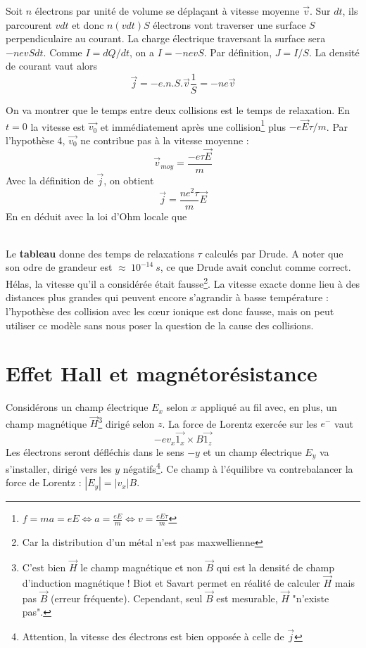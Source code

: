 Soit $n$ électrons par unité de volume se déplaçant à vitesse moyenne $\vec{v}$. Sur 
$dt$, ils parcourent $vdt$ et donc $n(vdt)S$ électrons vont traverser une surface $S$ 
perpendiculaire au courant. La charge électrique traversant la surface sera $-nevSdt$.
Comme $I = dQ/dt$, on a $I = -nevS$. Par définition, $J = I/S$. La densité de courant 
vaut alors
\begin{equation}
\vec j = -e.n.S.\vec v\frac{1}{S} = -ne\vec{v}
\end{equation}

On va montrer que le temps entre deux collisions est le temps de relaxation. En $t=0$ 
la vitesse est $\vec{v_0}$ et immédiatement après une collision\footnote{$f = ma = eE 
\Leftrightarrow a = \frac{eE}{m} \Leftrightarrow v = \frac{eE\tau }{m}$} plus $-e\vec{E}
\tau/m$. Par l'hypothèse 4, $\vec{v_0}$ ne contribue pas à la vitesse moyenne :
\begin{equation}
\vec{v}_{moy} = \dfrac{-e\tau\vec E}{m}
\end{equation}
Avec la définition de $\vec j$, on obtient
\begin{equation}
\vec j = \dfrac{ne^2\tau}{m}\vec{E}
\end{equation}
En en déduit avec la loi d'Ohm locale que\\
\

\newpage\noindent
Le \textbf{tableau} donne des temps de relaxations $\tau$ calculés par Drude. A noter 
que son odre de grandeur est $\approx\ 10^{-14}\ s$, ce que Drude avait conclut comme 
correct.  Hélas, la vitesse qu'il a considérée était fausse\footnote{Car la distribution 
d'un métal n'est pas maxwellienne}. La vitesse exacte donne lieu à des distances 
plus grandes qui peuvent encore s’agrandir à basse température : l’hypothèse des 
collision avec les cœur ionique est donc fausse, mais on peut utiliser ce modèle sans 
nous poser la question de la cause des collisions.

\section{Effet Hall et magnétorésistance}
Considérons un champ électrique $E_x$ selon $x$ appliqué au fil avec, en plus, un 
champ magnétique $\vec{H}$\footnote{C'est bien $\vec{H}$ le champ magnétique et non 
$\vec B$ qui est la densité de champ d'induction magnétique ! Biot et Savart permet 
en réalité de calculer $\vec{H}$ mais pas $\vec{B}$ (erreur fréquente). Cependant, 
seul $\vec{B}$ est mesurable, $\vec{H}$ "n'existe pas".} dirigé selon $z$. La force 
de Lorentz exercée sur les $e^-$ vaut 
\begin{equation}
-ev_x\vec{1_x}\times B\vec{1_z}
\end{equation}
Les électrons seront défléchis dans le sens $-y$ et un champ électrique $E_y$ va 
s'installer, dirigé vers les $y$ négatifs\footnote{Attention, la vitesse des 
électrons est bien opposée à celle de $\vec{j}$}. Ce champ à l'équilibre va 
contrebalancer la force de Lorentz : $|E_y| = |v_x|B$.\\

